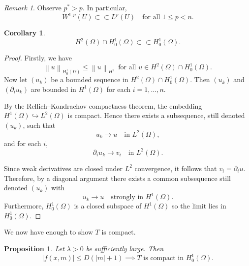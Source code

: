 \documentclass[11pt]{article}
\numberwithin{equation}{section}
\newtheorem{proposition}[proposition]{Proposition}
\newtheorem{corollary}[corollary]{Corollary}
\theoremstyle{definition}
\theoremstyle{remark}
\newtheorem{remark}[remark]{Remark}
\newcommand{\Honez}{H_0^1(\Omega)}
\newcommand{\norm}[1]{\left\lVert #1 \right\rVert}
\begin{document}
\begin{remark}
Observe $p^\ast>p$. In particular,
\[W^{1,p}(U)\subset\subset L^p(U) \quad\text{for all }1\le p<n.\]
\end{remark}
\begin{corollary}
\label{cor:embed}
\[
H^2(\Omega) \cap H_0^1(\Omega) \subset \subset \Honez.
\]
\end{corollary}
\begin{proof}
Firstly, we have \[\norm{u}_{\Honez} \le \norm{u}_{H^2} \, \text{ for all } u \in H^2(\Omega) \cap \Honez.\]
Now let $(u_k)$ be a bounded sequence in $H^2(\Omega)\cap \Honez$. 
Then $(u_k)$ and $(\partial_i u_k)$ are bounded in $H^1(\Omega)$ for 
each $i=1,\dots,n$. 

By the Rellich--Kondrachov compactness theorem, the embedding 
$H^1(\Omega)\hookrightarrow L^2(\Omega)$ is compact. Hence there exists 
a subsequence, still denoted $(u_k)$, such that
\[
u_k \to u \quad \text{in } L^2(\Omega),
\]
and for each $i$,
\[
\partial_i u_k \to v_i \quad \text{in } L^2(\Omega).
\]

Since weak derivatives are closed under $L^2$ convergence, it follows 
that $v_i=\partial_i u$. Therefore, by a diagonal argument there exists a common subsequence still denoted $(u_k)$ with
\[
u_k \to u \quad \text{strongly in } H^1(\Omega).
\]
Furthermore, $\Honez$ is a closed subspace of $H^1(\Omega)$ so the limit lies in $\Honez$.
\end{proof}
We now have enough to show $T$ is compact.
\begin{proposition}
  \label{prop:t-comp}
  Let $\lambda >0$ be sufficiently large. Then
  \[ |f(x,m)| \le D(|m| + 1) \implies T \text{ is compact in } \Honez.\] 
\end{proposition}
\end{document}

